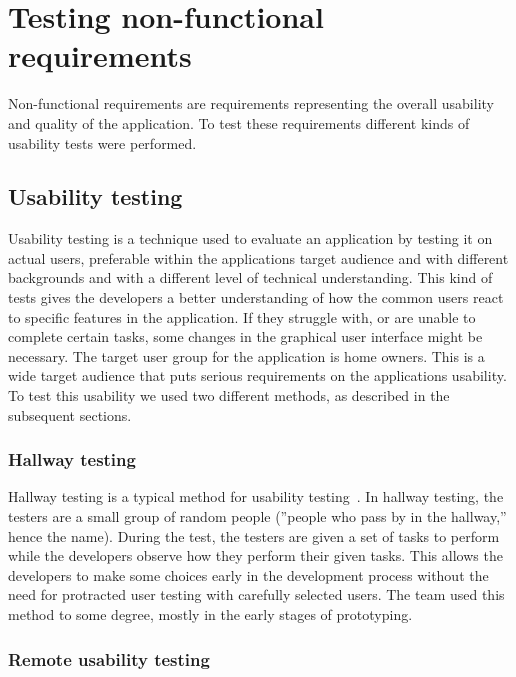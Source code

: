 \section{Testing non-functional requirements}
\label{sec:testingnonfunctionalrequirements}
Non-functional requirements are requirements representing the overall usability and quality of the application. To test these requirements different kinds of usability tests were performed.

\subsection{Usability testing}
\label{sec:userTest}

Usability testing is a technique used to evaluate an application by testing it on actual users, preferable within the applications target audience and with different backgrounds and with a different level of technical understanding. This kind of tests gives the developers a better understanding of how the common users react to specific features in the application. If they struggle with, or are unable to complete certain tasks, some changes in the graphical user interface might be necessary.
The target user group for the application is home owners. This is a wide target audience that puts serious requirements on the applications usability. To test this usability we used two different methods, as described in the subsequent sections.

\subsubsection{Hallway testing}
Hallway testing is a typical method for usability testing~\cite{hallwaytesting}. In hallway testing, the testers are a small group of random people (''people who pass by in the hallway,'' hence the name). During the test, the testers are given a set of tasks to perform while the developers observe how they perform their given tasks. This allows the developers to make some choices early in the development process without the need for protracted user testing with carefully selected users. 
The team used this method to some degree, mostly in the early stages of prototyping.


\subsubsection{Remote usability testing}

